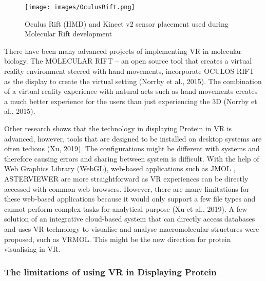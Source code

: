 \begin{figure}[!htp]
	\centering
	\texttt{[image: images/OculusRift.png]}
	\caption{Oculus Rift (HMD) and Kinect v2 sensor placement used during Molecular Rift development}
	\label{fig:OculusRift}
\end{figure}


There have been many advanced projects of implementing VR in molecular biology. The {\footnotesize MOLECULAR RIFT} – an open source tool that creates a virtual reality environment steered with hand movements, incorporate {\footnotesize OCULOS RIFT} as the display to create the virtual setting (Norrby et al., 2015). The combination of a virtual reality experience with natural acts such as hand movements creates a much better experience for the users than just experiencing the 3D (Norrby et al., 2015).

Other research shows that the technology in displaying Protein in VR is advanced, however, tools that are designed to be installed on desktop systems are often tedious (Xu, 2019).  The configurations might be different with systems and therefore causing errors and sharing between system is difficult. With the help of Web Graphics Library (WebGL), web-based applications such as {\footnotesize JMOL} , {\footnotesize ASTERVIEWER} are more straightforward as VR experiences can be directly accessed with common web browsers. However, there are many limitations for these web-based applications because it would only support a few file types and cannot perform complex tasks for analytical purpose (Xu et al., 2019). A few solution of an integrative cloud-based system that can directly access databases and uses VR technology to visualise and analyse macromolecular structures were proposed, such as {\footnotesize VRMOL}. This might be the new direction for protein visualising in VR.

\subsubsection{The limitations of using VR in Displaying Protein}

